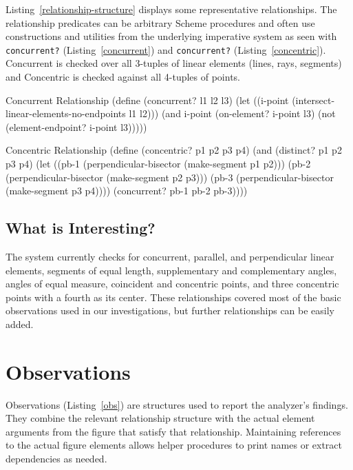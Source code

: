 Listing~\ref{relationship-structure} displays some representative
relationships.  The relationship predicates can be arbitrary Scheme
procedures and often use constructions and utilities from the
underlying imperative system as seen with \texttt{concurrent?}
(Listing~\ref{concurrent}) and \texttt{concurrent?}
(Listing~\ref{concentric}). Concurrent is checked over all 3-tuples of
linear elements (lines, rays, segments) and Concentric is checked
against all 4-tuples of points.

\begin{code-listing}
[label=concurrent]
{Concurrent Relationship}
(define (concurrent? l1 l2 l3)
  (let ((i-point (intersect-linear-elements-no-endpoints l1 l2)))
    (and i-point
         (on-element? i-point l3)
         (not (element-endpoint? i-point l3)))))
\end{code-listing}

\begin{code-listing}
[label=concentric]
{Concentric Relationship}
(define (concentric? p1 p2 p3 p4)
  (and (distinct? p1 p2 p3 p4)
       (let ((pb-1 (perpendicular-bisector
                    (make-segment p1 p2)))
             (pb-2 (perpendicular-bisector
                    (make-segment p2 p3)))
             (pb-3 (perpendicular-bisector
                    (make-segment p3 p4))))
         (concurrent? pb-1 pb-2 pb-3))))
\end{code-listing}

\subsection{What is Interesting?}
The system currently checks for concurrent, parallel, and
perpendicular linear elements, segments of equal length, supplementary
and complementary angles, angles of equal measure, coincident and
concentric points, and three concentric points with a fourth as its
center. These relationships covered most of the basic observations
used in our investigations, but further relationships can be easily
added.

\section{Observations}

Observations (Listing~\ref{obs}) are structures used to report the
analyzer's findings. They combine the relevant relationship structure
with the actual element arguments from the figure that satisfy that
relationship. Maintaining references to the actual figure elements
allows helper procedures to print names or extract dependencies as
needed.

